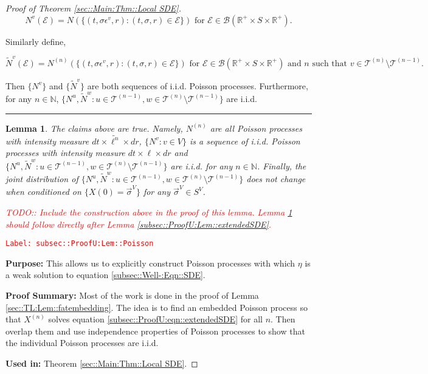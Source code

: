 \documentclass[12pt]{article}
\newcommand{\mb}{\mathbb}
\newcommand{\mc}{\mathcal}
\newcommand{\ms}{\mathscr}
\newcommand{\te}{\text}
\newcommand{\ep}{\epsilon}
\newcommand{\tr}{\textcolor{red}}
\newcommand{\labe}[1]{\tr{\texttt{Label: #1}}}
\newcommand{\purpose}{\textbf{Purpose: }}
\newcommand{\pfsum}{\textbf{Proof Summary: }}
\newcommand{\usein}{\textbf{Used in: }}
\newcommand{\lin}{\rule{\linewidth}{0.4 pt}}
\renewcommand{\v}{v}							%
\newcommand{\vv}{u}								%
\newcommand{\vvv}{w}							%
\renewcommand{\S}{S}							%
\newcommand{\s}{\sigma}							%
\newcommand{\sv}{\vec{\s}}						%
\newcommand{\ev}{\ep}							%
\renewcommand{\t}{t}							%
\newcommand{\X}{X}								%
\newcommand{\vind}[1]{^{#1}}					%
\newcommand{\carp}[1]{^{#1}}					%
\newcommand{\vsi}[1]{^{#1}}						%
\newcommand{\tp}[1]{(#1)}						%
\newcommand{\tree}{\mc{T}}						%
\newcommand{\sln}[1]{^{(#1)}}					%
\newcommand{\poiss}{N}							%
\newcommand{\Sm}{\ell}							%
\renewcommand{\r}{r}							%
\newcommand{\alt}[1]{\widetilde{#1}}			%
\newcommand{\mmm}{\eta}							%
\newcommand{\evnt}{\mc{E}}						%
\newtheorem{lem}[thms]{Lemma}
\begin{document}
\begin{proof}[Proof of Theorem \ref{sec::Main:Thm::Local SDE}]
\[\poiss\vind{\v}(\evnt) = \poiss\left(\{(\t,\s\ev\vind{\v},\r):(\t,\s,\r)\in \evnt\}\right) \te{ for } \evnt \in \ms{B}(\mb{R}^+\times\S\times\mb{R}^+).\]

Similarly define,

\[\alt{\poiss}\vind{\v}(\evnt) = \poiss\sln{n}\left(\{(\t,\s\ev\vind{\v},\r):(\t,\s,\r)\in \evnt\}\right)\te{ for } \evnt \in \ms{B}(\mb{R}^+\times\S\times\mb{R}^+)\te{ and }n\te{ such that } \v\in \tree\sln{n}\setminus\tree\sln{n-1}.\]

Then \(\{\poiss\vind{\v}\}\) and \(\{\alt{\poiss}\vind{\v}\}\) are both sequences of i.i.d. Poisson processes. Furthermore, for any \(n \in \mb{N}\), \(\{\poiss\vind{\vv},\alt{\poiss}\vind{\vvv}:\vv\in \tree\sln{n-1},\vvv\in\tree\sln{n}\setminus\tree\sln{n-1}\}\) are i.i.d.

\lin

\begin{lem}
The claims above are true. Namely, \(\poiss\sln{n}\) are all Poisson processes with intensity measure \(d\t\times\alt{\Sm^{n}}\times d\r\), \(\{\poiss\vind{\v}:\v\in V\}\) is a sequence of i.i.d. Poisson processes with intensity measure \(d\t\times\Sm\times d\r\) and \(\{\poiss\vind{\vv},\alt{\poiss}\vind{\vvv}:\vv\in \tree\sln{n-1},\vvv\in\tree\sln{n}\setminus\tree\sln{n-1}\}\) are i.i.d. for any \(n \in \mb{N}\). Finally, the joint distribution of \(\{\poiss\vind{\vv},\alt{\poiss}\vind{\vvv}:\vv\in \tree\sln{n-1},\vvv\in\tree\sln{n}\setminus\tree\sln{n-1}\}\) does not change when conditioned on \(\{\X\tp{0} = \sv\vsi{V}\}\) for any \(\sv\vsi{V}\in \S\carp{V}\).

\tr{TODO:: Include the construction above in the proof of this lemma. Lemma \ref{subsec::ProofU:Lem::Poisson} should follow directly after Lemma \ref{subsec::ProofU:Lem::extendedSDE}.}
\label{subsec::ProofU:Lem::Poisson}
\end{lem}
\labe{subsec::ProofU:Lem::Poisson}

\purpose This allows us to explicitly construct Poisson processes with which \(\mmm\) is a weak solution to equation \eqref{subsec::Well-:Eqn::SDE}.

\pfsum Most of the work is done in the proof of Lemma \ref{sec::TL:Lem::fatembedding}. The idea is to find an embedded Poisson process so that \(\X\sln{n}\) solves equation \eqref{subsec::ProofU:eqn::extendedSDE} for all \(n\). Then overlap them and use independence properties of Poisson processes to show that the individual Poisson processes are i.i.d.

\usein Theorem \ref{sec::Main:Thm::Local SDE}.


\end{proof}
\end{document}
